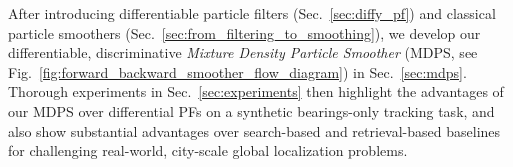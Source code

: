     After introducing differentiable particle filters (Sec.~\ref{sec:diffy_pf}) and classical particle smoothers (Sec.~\ref{sec:from_filtering_to_smoothing}), we develop our differentiable, discriminative \emph{Mixture Density Particle Smoother} (MDPS, see Fig.~\ref{fig:forward_backward_smoother_flow_diagram}) in Sec.~\ref{sec:mdps}. Thorough experiments in Sec.~\ref{sec:experiments} then highlight the advantages of our MDPS over differential PFs on a synthetic bearings-only tracking task, and also show substantial advantages over search-based and retrieval-based baselines for challenging real-world, city-scale global localization problems.    


    



